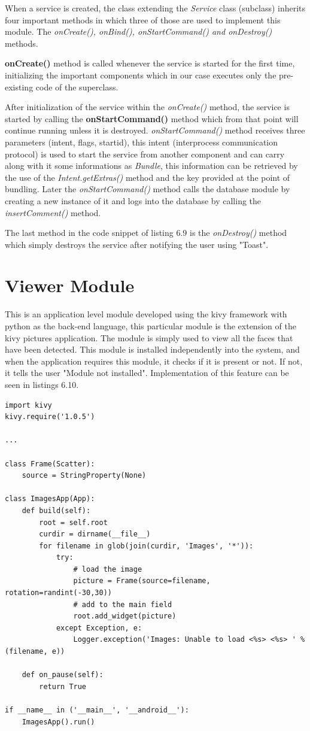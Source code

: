 When a service is created, the class extending the {\it Service} class (subclass) inherits four important methods in which three of those are used to implement this module. The {\it onCreate(), onBind(), onStartCommand() and onDestroy()} methods.

{\bf onCreate()} method is called whenever the service is started for the first time, initializing the important components which in our case executes only the pre-existing code of the superclass.

After initialization of the service within the {\it onCreate()} method, the service is started by calling the {\bf onStartCommand()} method which from that point will continue running unless it is destroyed. {\it onStartCommand()} method receives three parameters (intent, flags, startid), this intent (interprocess communication protocol) is used to start the service from another component and can carry along with it some informations as {\it Bundle}, this information can be retrieved by the use of the {\it Intent.getExtras()} method and the key provided at the point of bundling. Later the {\it onStartCommand()} method calls the database module by creating a new instance of it and logs into the database by calling the {\it insertComment()} method.

The last method in the code snippet of listing 6.9 is the {\it onDestroy()} method which simply destroys the service after notifying the user using "Toast".

\section{Viewer Module}
This is an application level module developed using the kivy framework with python as the back-end language, this particular module is the extension of the kivy pictures application. The module is simply used to view all the faces that have been detected. This module is installed independently into the system, and when the application requires this module, it checks if it is present or not. If not, it tells the user "Module not installed". Implementation of this feature can be seen in listings 6.10.

\begin{lstlisting}[label=kivy-python,caption=Implementation of Viewer module] 
import kivy
kivy.require('1.0.5')

...

class Frame(Scatter):
    source = StringProperty(None)

class ImagesApp(App):
    def build(self):
        root = self.root
        curdir = dirname(__file__)
        for filename in glob(join(curdir, 'Images', '*')):
            try:
                # load the image
                picture = Frame(source=filename, rotation=randint(-30,30))
                # add to the main field
                root.add_widget(picture)
            except Exception, e:
                Logger.exception('Images: Unable to load <%s> <%s> ' % (filename, e))

    def on_pause(self):
        return True

if __name__ in ('__main__', '__android__'):
    ImagesApp().run()
\end{lstlisting}

